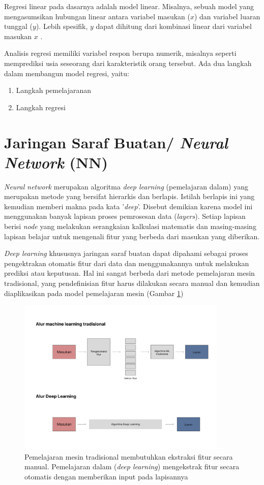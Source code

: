 Regresi linear pada dasarnya adalah model linear. Misalnya, sebuah model yang mengasumsikan hubungan linear antara variabel masukan ($x$) dan variabel luaran tunggal ($y$). Lebih spesifik, $y$ dapat dihitung dari kombinasi linear dari variabel masukan $x$ \citep{brownlee_2016}. 

Analisis regresi memiliki variabel respon berupa numerik, misalnya seperti memprediksi usia seseorang dari karakteristik orang tersebut. Ada dua langkah dalam membangun model regresi, yaitu:
\begin{enumerate}
    \item Langkah pemelajaranan
    \item Langkah regresi
\end{enumerate}

\section{Jaringan Saraf Buatan/ \emph{Neural Network} (NN)}
\emph{Neural network} merupakan algoritma \emph{deep learning} (pemelajaran dalam) yang merupakan metode yang bersifat hierarkis dan berlapis. Istilah berlapis ini yang kemudian memberi makna pada kata '\emph{deep}'. Disebut demikian karena model ini menggunakan banyak lapisan proses pemrosesan data (\emph{layers}). Setiap lapisan berisi \emph{node} yang melakukan serangkaian kalkulasi matematis dan masing-masing lapisan belajar untuk mengenali fitur yang berbeda dari masukan yang diberikan. 

\emph{Deep learning} khususnya jaringan saraf buatan dapat dipahami sebagai proses pengektrakan otomatis fitur dari data dan menggunakannya untuk melakukan prediksi atau keputusan. Hal ini sangat berbeda dari metode pemelajaran mesin tradisional, yang pendefinisian fitur harus dilakukan secara manual dan kemudian diaplikasikan pada model pemelajaran mesin (Gambar \ref{deepflow})\citep{Li_Li_Gao}

\begin{figure}[h]
    \centering
    \includegraphics[width=10cm]{gambar/alur_deep_learning.png}
    \caption{Pemelajaran mesin tradisional membutuhkan ekstraksi fitur secara manual. Pemelajaran dalam (\emph{deep learning}) mengekstrak fitur secara otomatis dengan memberikan input pada lapisannya}
    \label{deepflow}
\end{figure}

